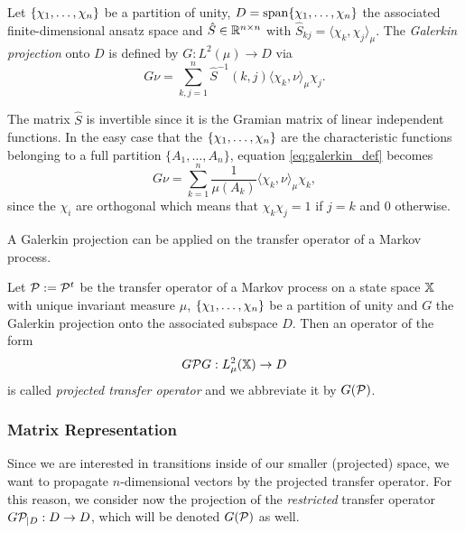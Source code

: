 \begin{defi}
Let $\{ \chi_1,\dots,\chi_n \}$ be a partition of unity, $D = \mathrm{span}\{\chi_1,\dots,\chi_n\}$ the associated finite-dimensional ansatz space and $\hat{S} \in \mathbb{R}^{n\times n}$ with $\hat{S}_{kj} = \langle \chi_k, \chi_j \rangle_\mu$. The \textit{Galerkin projection} onto $D$ is defined by $G: L^2 (\mu) \rightarrow D$ via
\begin{equation}
\label{eq:galerkin_def}
G\nu = \sum_{k,j=1}^n \hat{S}^{-1}(k,j) \langle \chi_k, \nu \rangle_\mu \chi_j.
\end{equation}
\end{defi}

The matrix $\hat{S}$ is invertible since it is the Gramian matrix of linear independent functions.
In the easy case that the $\{\chi_1,\dots,\chi_n\}$ are the characteristic functions belonging to a full partition $\{A_1,\dots,A_n\}$, equation \eqref{eq:galerkin_def} becomes 
\begin{equation*}
G\nu = \sum_{k=1}^n \frac{1}{\mu(A_k)} \langle \chi_k, \nu \rangle_\mu \chi_k,
\end{equation*}
since the $\chi_i$ are orthogonal which means that $\chi_k \chi_j = 1$ if $j=k$ and $0$ otherwise.

A Galerkin projection can be applied on the transfer operator of a Markov process.

\begin{defi}
Let $\mathcal{P} := \mathcal{P}^t$ be the transfer operator of a Markov process on a state space $\mathbb{X}$ with unique invariant measure $\mu$, $\{ \chi_1,\dots,\chi_n \}$ be a partition of unity and $G$ the Galerkin projection onto the associated subspace $D$. Then an operator of the form
\begin{equation*}
G \mathcal{P} G: L_\mu^2 (\mathbb{X}) \rightarrow D
\end{equation*}
is called \textit{projected transfer operator} and we abbreviate it by $G(\mathcal{P})$.
\end{defi}

\subsubsection*{Matrix Representation}

Since we are interested in transitions inside of our smaller (projected) space, we want to propagate $n$-dimensional vectors by the projected transfer operator. For this reason, we consider now the projection of the \textit{restricted} transfer operator $G\mathcal{P}_{\mid D} : D \rightarrow D$, which will be denoted $G(\mathcal{P})$ as well.


